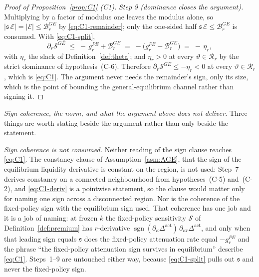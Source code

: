\documentclass[11pt]{article}
\newcommand{\Dact}{\Delta^{\mathrm{act}}}
\begin{document}
\begin{proof}[Proof of Proposition~\ref{prop:C1} (C1)]
\emph{Step 9 (dominance closes the argument).} Multiplying by a factor of modulus one leaves the
modulus alone, so $\lvert \mathfrak s\,\mathcal E\rvert = \lvert\mathcal E\rvert \le
\mathcal B_r^{GE}$ by \eqref{eq:C1-remainder}; only the one-sided half
$\mathfrak s\,\mathcal E \le \mathcal B_r^{GE}$ is consumed. With \eqref{eq:C1-split},
\begin{equation}
\label{eq:C1-eta}
\partial_r\mathcal S^{GE}
\;\le\; -\,g_r^{PE} + \mathcal B_r^{GE}
\;=\; -\bigl(g_r^{PE} - \mathcal B_r^{GE}\bigr)
\;=\; -\,\eta_r ,
\end{equation}
with $\eta_r$ the slack of Definition~\ref{def:theta}; and $\eta_r > 0$ at every
$\vartheta\in\mathcal R_r$ by the strict dominance of hypothesis~(C-6). Therefore
$\partial_r\mathcal S^{GE} \le -\eta_r < 0$ at every $\vartheta\in\mathcal R_r$, which is
\eqref{eq:C1}. The argument never needs the remainder's sign, only its size, which is the point of
bounding the general-equilibrium channel rather than signing it.
\end{proof}

\medskip
\noindent\emph{Sign coherence, the norm, and what the argument above does not deliver.}
Three things are worth stating beside the argument rather than only beside the statement.

\emph{Sign coherence is not consumed.} Neither reading of the sign clause reaches \eqref{eq:C1}. The
constancy clause of Assumption~\ref{asm:AGE}, that the sign of the equilibrium liquidity
derivative is constant on the region, is not used: Step~7 derives constancy on a connected
neighbourhood from hypotheses~(C-5) and~(C-2), and \eqref{eq:C1-deriv} is a pointwise statement, so
the clause would matter only for naming one sign across a disconnected region. Nor is the coherence
of the fixed-policy sign with the equilibrium sign used. That coherence has one job and it is a job
of naming: at frozen $k$ the fixed-policy sensitivity $\mathcal S$ of Definition~\ref{def:premium}
has $r$-derivative $\operatorname{sgn}(\partial_\kappa\Dact)\,\partial_{\kappa r}\Dact$, and only
when that leading sign equals $\mathfrak s$ does the fixed-policy attenuation rate equal $-g_r^{PE}$
and the phrase ``the fixed-policy attenuation sign survives in equilibrium'' describe
\eqref{eq:C1}. Steps~1--9 are untouched either way, because \eqref{eq:C1-split} pulls out
$\mathfrak s$ and never the fixed-policy sign.
\end{document}

